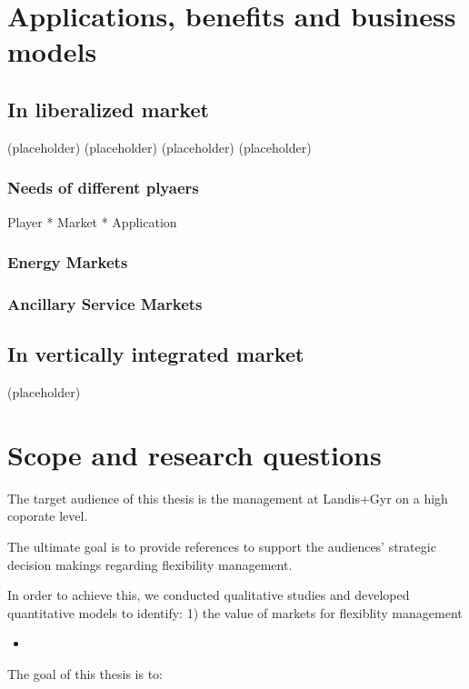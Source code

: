 \section{Applications, benefits and business models}
\subsection{In liberalized market}
(placeholder)
\newpage
(placeholder)
\newpage
(placeholder)
\newpage
(placeholder)
\newpage

\subsubsection{Needs of different plyaers}

Player * Market * Application


\subsubsection{Energy Markets}


\subsubsection{Ancillary Service Markets}

\subsection{In vertically integrated market}
(placeholder)
\newpage


\section{Scope and research questions}

The target audience of this thesis is the management at Landis+Gyr on a high coporate level.

The ultimate goal is to provide references to support the audiences' strategic decision makings regarding flexibility management.

In order to achieve this, we conducted qualitative studies and developed quantitative models to identify: 1) the value of markets for flexiblity management

\begin{itemize}
	\item 
\end{itemize}

The goal of this thesis is to:

